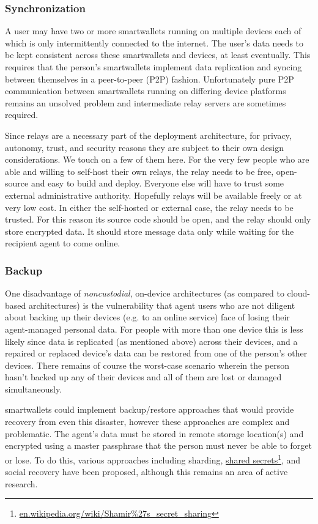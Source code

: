 \documentclass[11pt, oneside]{article}   	%
\newcommand{\hyperfootnote}[1][]{\def\ArgI{{#1}}\hyperfootnoteRelay}
\newcommand\hyperfootnoteRelay[2][]{\href{#1#2}{\ArgI}\footnote{\href{#1#2}{#2}}}
\begin{document}
\subsubsection{Synchronization}

A user may have two or more smartwallets running on multiple devices each of which is only intermittently connected to the internet. The user's data needs to be kept consistent across these smartwallets and devices, at least eventually. This requires that the person's smartwallets implement data replication and syncing between themselves in a peer-to-peer (P2P) fashion. Unfortunately pure P2P communication between smartwallets running on differing device platforms remains an unsolved problem and intermediate relay servers are sometimes required. 

Since relays are a necessary part of the deployment architecture, for privacy, autonomy, trust, and security reasons they are subject to their own design considerations. We touch on a few of them here. For the very few people who are able and willing to self-host their own relays, the relay needs to be free, open-source and easy to build and deploy. Everyone else will have to trust some external administrative authority. Hopefully relays will be available freely or at very low cost. In either the self-hosted or external case, the relay needs to be trusted. For this reason its source code should be open, and the relay should only store encrypted data. It should store message data only while waiting for the recipient agent to come online.

\subsubsection{Backup} 

One disadvantage of \emph{noncustodial}, on-device architectures (as compared to cloud-based architectures) is the vulnerability that agent users who are not diligent about backing up their devices (e.g. to an online service) face of losing their agent-managed personal data. For people with more than one device this is less likely since data is replicated (as mentioned above) across their devices, and a repaired or replaced device's data can be restored from one of the person's other devices. There remains of course the worst-case scenario wherein the person hasn't backed up any of their devices and all of them are lost or damaged simultaneously. 

smartwallets could implement backup/restore approaches that would provide recovery from even this disaster, however these approaches are complex and problematic. The agent's data must be stored in remote storage location(s) and encrypted using a master passphrase that the person must never be able to forget or lose. To do this, various approaches including sharding, \hyperfootnote[shared secrets][https://]{en.wikipedia.org/wiki/Shamir\%27s\_secret\_sharing}, and social recovery have been proposed, although this remains an area of active research. 
\end{document}

